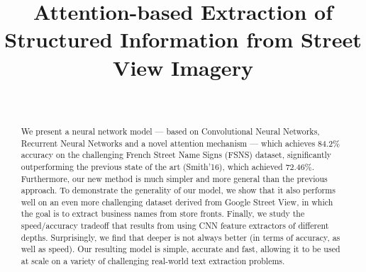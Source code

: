 \documentclass[conference]{IEEEtran}
\begin{document}
\title{Attention-based Extraction of Structured Information from Street View Imagery}

\author{
\and
{}
\and
{}
\and
{}
\and
{}
\and
{}
\and
{}
}

\author{
\\
}



\maketitle

\begin{abstract}
  We present a neural network model --- based on Convolutional Neural Networks, Recurrent Neural Networks and
  a novel attention mechanism --- which achieves 84.2\% accuracy on the challenging French
Street Name Signs (FSNS) dataset, significantly outperforming the
previous state of the art (Smith'16), which achieved
72.46\%. Furthermore, our new method is much simpler and more general
than the previous approach. To demonstrate the generality of our
model, we show that it also performs well on
an  even more challenging dataset derived from
Google Street View,
in which the goal is to extract business names from
store fronts.
Finally, we study the speed/accuracy tradeoff that
results from using CNN feature extractors of different depths.
Surprisingly, we find that deeper is not always better (in terms of accuracy,
as well as speed).
Our resulting model is simple, accurate and fast, allowing it to be
used at scale on a variety of challenging real-world text extraction
problems.   
\end{abstract}
\end{document}
